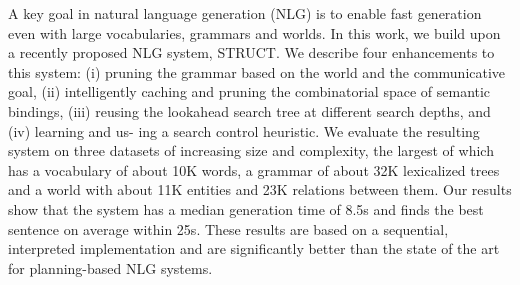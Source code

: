 A key goal in natural language generation (NLG) is to enable fast generation even with large vocabularies, grammars and worlds. In this work, we build upon a recently proposed NLG system, STRUCT. We describe four enhancements to this system: (i) pruning the grammar based on the world and the communicative goal, (ii) intelligently caching and pruning the combinatorial space of semantic bindings, (iii) reusing the lookahead search tree at different search depths, and (iv) learning and us- ing a search control heuristic. We evaluate the resulting system on three datasets of increasing size and complexity, the largest of which has a vocabulary of about 10K words, a grammar of about 32K lexicalized trees and a world with about 11K entities and 23K relations between them. Our results show that the system has a median generation time of 8.5s and finds the best sentence on average within 25s. These results are based on a sequential, interpreted implementation and are significantly better than the state of the art for planning-based NLG systems.
